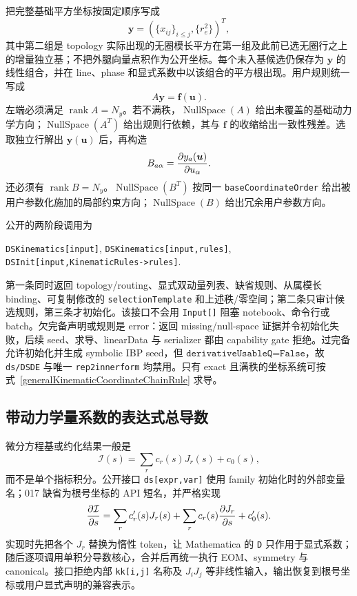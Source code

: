 ﻿\documentclass[a4paper,11pt]{article}
\begin{document}
把完整基础平方坐标按固定顺序写成
\begin{equation}
 \bm y=(\{x_{ij}\}_{i\le j},\{r_e^2\})^T,
\end{equation}
其中第二组是 topology 实际出现的无圈模长平方在第一组及此前已选无圈行之上的增量独立基；不把外腿向量点积作为公开坐标。每个未入基候选仍保存为 $\bm y$ 的线性组合，并在 line、phase 和显式系数中以该组合的平方根出现。用户规则统一写成
\begin{equation}
 A\bm y=\bm f(\bm u).
 \label{kinematicRuleMatrix}
\end{equation}
左端必须满足 $\operatorname{rank}A=N_y$。若不满秩，$\operatorname{NullSpace}(A)$ 给出未覆盖的基础动力学方向；$\operatorname{NullSpace}(A^T)$ 给出规则行依赖，其与 $\bm f$ 的收缩给出一致性残差。选取独立行解出 $\bm y(\bm u)$ 后，再构造
\begin{equation}
 B_{a\alpha}={\partial y_a(\bm u)\over\partial u_\alpha}.
\end{equation}
还必须有 $\operatorname{rank}B=N_y$。$\operatorname{NullSpace}(B^T)$ 按同一 \texttt{baseCoordinateOrder} 给出被用户参数化施加的局部约束方向；$\operatorname{NullSpace}(B)$ 给出冗余用户参数方向。

公开的两阶段调用为
\begin{center}
 \texttt{DSKinematics[input]},\qquad
 \texttt{DSKinematics[input,rules]},\\
 \texttt{DSInit[input,KinematicRules->rules]}.
\end{center}
第一条同时返回 topology/routing、显式双动量列表、缺省规则、从属模长 binding、可复制修改的 \texttt{selectionTemplate} 和上述秩/零空间；第二条只审计候选规则，第三条才初始化。该接口不会用 \texttt{Input[]} 阻塞 notebook、命令行或 batch。欠完备声明或规则是 error：返回 missing/null-space 证据并令初始化失败，后续 seed、求导、linearData 与 serializer 都由 capability gate 拒绝。过完备允许初始化并生成 symbolic IBP seed，但 $\texttt{derivativeUsableQ=False}$，故 \texttt{ds/DSDE} 与唯一 \texttt{rep2innerform} 均禁用。只有 exact 且满秩的坐标系统可按式~\eqref{generalKinematicCoordinateChainRule} 求导。

\subsection{带动力学量系数的表达式总导数}

微分方程基或约化结果一般是
\begin{equation}
  \mathcal I(s)=\sum_r c_r(s)J_r(s)+c_0(s),
\end{equation}
而不是单个指标积分。公开接口 \verb|ds[expr,var]| 使用 family 初始化时的外部变量名；017 缺省为根号坐标的 API 短名，并严格实现
\begin{equation}
  {\partial\mathcal I\over\partial s}
  =\sum_r c'_r(s)J_r(s)
  +\sum_r c_r(s){\partial J_r\over\partial s}
  +c'_0(s).
  \label{expressionTotalDerivative}
\end{equation}
实现时先把各个 $J_r$ 替换为惰性 token，让 Mathematica 的 \texttt{D} 只作用于显式系数；随后逐项调用单积分导数核心，合并后再统一执行 EOM、symmetry 与 canonical。接口拒绝内部 \texttt{kk[i,j]} 名称及 $J_iJ_j$ 等非线性输入，输出恢复到根号坐标或用户显式声明的兼容表示。
\end{document}
